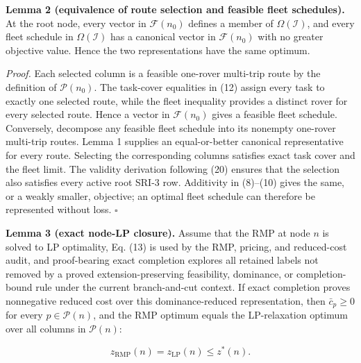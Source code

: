 \documentclass[
  11pt,
]{article}
\begin{document}
\textbf{Lemma 2 (equivalence of route selection and feasible fleet
schedules).} At the root node, every vector in \(\mathcal{F}(n_0)\)
defines a member of \(\Omega(\mathcal{I})\), and every fleet schedule in
\(\Omega(\mathcal{I})\) has a canonical vector in \(\mathcal{F}(n_0)\)
with no greater objective value. Hence the two representations have the
same optimum.

\emph{Proof.} Each selected column is a feasible one-rover multi-trip
route by the definition of \(\mathcal{P}(n_0)\). The task-cover
equalities in (12) assign every task to exactly one selected route,
while the fleet inequality provides a distinct rover for every selected
route. Hence a vector in \(\mathcal{F}(n_0)\) gives a feasible fleet
schedule. Conversely, decompose any feasible fleet schedule into its
nonempty one-rover multi-trip routes. Lemma 1 supplies an
equal-or-better canonical representative for every route. Selecting the
corresponding columns satisfies exact task cover and the fleet limit.
The validity derivation following (20) ensures that the selection also
satisfies every active root SRI-3 row. Additivity in (8)--(10) gives the
same, or a weakly smaller, objective; an optimal fleet schedule can
therefore be represented without loss. \(\square\)

\textbf{Lemma 3 (exact node-LP closure).} Assume that the RMP at node
\(n\) is solved to LP optimality, Eq. (13) is used by the RMP, pricing,
and reduced-cost audit, and proof-bearing exact completion explores all
retained labels not removed by a proved extension-preserving
feasibility, dominance, or completion-bound rule under the current
branch-and-cut context. If exact completion proves nonnegative reduced
cost over this dominance-reduced representation, then \(\bar c_p\ge 0\)
for every \(p\in\mathcal{P}(n)\), and the RMP optimum equals the
LP-relaxation optimum over all columns in \(\mathcal{P}(n)\):

\[
z_{\mathrm{RMP}}(n)
=z_{\mathrm{LP}}(n)
\le z^*(n).
\tag{25}
\]
\end{document}
